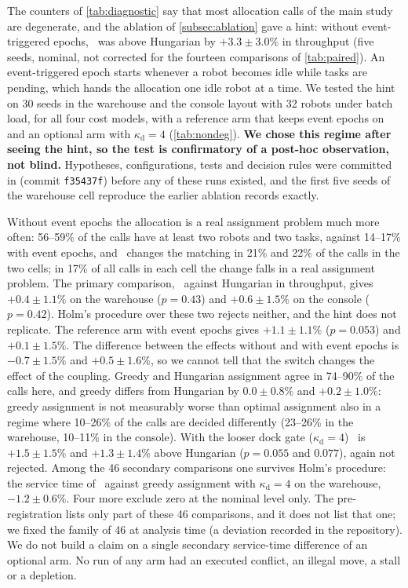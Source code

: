 The counters of \cref{tab:diagnostic} say that most allocation calls of the main
study are degenerate, and the ablation of \cref{subsec:ablation} gave a hint:
without event-triggered epochs, \sname\ was above Hungarian by
$+3.3\pm3.0\%$ in throughput (five seeds, nominal, not corrected for the
fourteen comparisons of \cref{tab:paired}). An event-triggered epoch starts
whenever a robot becomes idle while tasks are pending, which hands the
allocation one idle robot at a time. We tested the hint on 30 seeds in the
warehouse and the console layout with 32 robots under batch load, for all four
cost models, with a reference arm that keeps event epochs on and an optional
arm with $\kappa_{\mathrm{d}}=4$ (\cref{tab:nondeg}). \textbf{We chose this regime after seeing the hint, so the test is
confirmatory of a post-hoc observation, not blind.} Hypotheses, configurations, tests and decision rules
were committed in  (commit
\texttt{f35437f}) before any of these runs existed, and the first five seeds of the warehouse
cell reproduce the earlier ablation records exactly.

Without event epochs the allocation is a real assignment problem much more often:
56--59\% of the calls have at least two robots and two tasks, against 14--17\% with
event epochs, and \sname\ changes the matching in 21\% and 22\% of the calls
in the two cells; in 17\% of all calls in each cell the change falls in a real assignment problem. The primary comparison, \sname\ against Hungarian in
throughput, gives $+0.4\pm1.1\%$ on the warehouse ($p=0.43$) and $+0.6\pm1.5\%$ on
the console ($p=0.42$). Holm's procedure over these two rejects neither, and the
hint does not replicate. The reference arm with event epochs gives $+1.1\pm1.1\%$
($p=0.053$) and $+0.1\pm1.5\%$. The difference between the effects without and with event epochs is $-0.7\pm1.5\%$ and
$+0.5\pm1.6\%$, so we cannot tell that the switch changes the effect of the
coupling. Greedy and Hungarian assignment agree in 74--90\% of the calls here,
and greedy differs from Hungarian by $0.0\pm0.8\%$ and $+0.2\pm1.0\%$:
greedy assignment is not measurably worse than optimal assignment also in a regime where
10--26\% of the calls are decided differently (23--26\% in the warehouse, 10--11\% in the console). With the looser dock gate ($\kappa_{\mathrm{d}}=4$)
\sname\ is $+1.5\pm1.5\%$ and $+1.3\pm1.4\%$ above Hungarian ($p=0.055$ and
$0.077$), again not rejected. Among the 46 secondary comparisons one survives Holm's
procedure: the service time of \sname\ against greedy assignment with $\kappa_{\mathrm{d}}=4$ on the
warehouse, $-1.2\pm0.6\%$. Four more exclude zero at the nominal level only. The
pre-registration lists only part of these 46 comparisons, and it does not list that one; we fixed the family of 46 at analysis time (a
deviation recorded in the repository). We do not
build a claim on a single secondary service-time difference of an optional arm. No run of any
arm had an executed conflict, an illegal move, a stall or a depletion.

